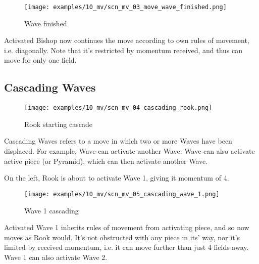 \clearpage %

\noindent
\begin{figure}[h]
\texttt{[image: examples/10\_mv/scn\_mv\_03\_move\_wave\_finished.png]}
\caption{Wave finished}
\label{fig:scn_mv_03_move_wave_finished}
\end{figure}

Activated Bishop now continues the move according to own rules of movement,
i.e. diagonally. Note that it's restricted by momentum received, and thus
can move for only one field.

\clearpage %

\subsection*{Cascading Waves}

\noindent
\begin{wrapfigure}[13]{l}{0.5625\textwidth}
\centering
\texttt{[image: examples/10\_mv/scn\_mv\_04\_cascading\_rook.png]}
\caption{Rook starting cascade}
\label{fig:scn_mv_04_cascading_rook}
\end{wrapfigure}
Cascading Waves refers to a move in which two or more Waves have been displaced.
For example, Wave can activate another Wave. Wave can also activate active
piece (or Pyramid), which can then activate another Wave.

On the left, Rook is about to activate Wave 1, giving it momentum of 4.

\vspace*{0.05\textheight}
\noindent
\begin{wrapfigure}[12]{r}{0.5625\textwidth}
\centering
\texttt{[image: examples/10\_mv/scn\_mv\_05\_cascading\_wave\_1.png]}
\caption{Wave 1 cascading}
\label{fig:scn_mv_05_cascading_wave_1}
\end{wrapfigure}
Activated Wave 1 inherits rules of movement from activating piece, and so now
moves as Rook would. It's not obstructed with any piece in its' way, nor it's
limited by received momentum, i.e. it can move further than just 4 fields away.
Wave 1 can also activate Wave 2.

